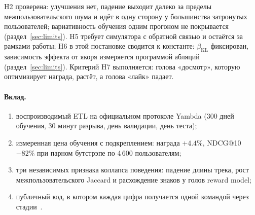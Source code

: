 H2 проверена: улучшения нет, падение выходит далеко за пределы
межпользовательского шума и идёт в одну сторону у большинства затронутых
пользователей; вариативность обучения одним прогоном не покрывается
(раздел~\ref{sec:limits}).
H5 требует симулятора с обратной связью и остаётся за рамками работы;
H6 в этой постановке сводится к константе: $\beta_{\text{KL}}$ фиксирован,
зависимость эффекта от якоря измеряется программой абляций
(раздел~\ref{sec:limits}). Критерий H7 выполняется: голова «досмотр»,
которую оптимизирует награда, растёт, а голова «лайк» падает.

\paragraph{Вклад.}
\begin{enumerate}[leftmargin=1.2em,itemsep=1pt,topsep=2pt]
  \item воспроизводимый ETL на официальном протоколе Yambda
        (300 дней обучения, 30 минут разрыва, день валидации, день теста);
  \item измеренная цена обучения с подкреплением: награда $+4.4\%$,
        NDCG@10 $-82\%$ при парном бутстрэпе по 4\,600 пользователям;
  \item три независимых признака коллапса поведения: падение длины трека,
        рост межпользовательского Jaccard и расхождение знаков у голов
        reward model;
  \item публичный код, в котором каждая цифра получается одной командой
        через стадии~.
\end{enumerate}
